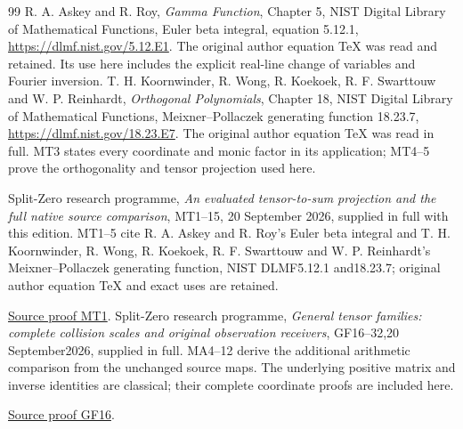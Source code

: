 \documentclass[11pt]{article}
\begin{document}
\begin{thebibliography}{99}
 R. A. Askey and R. Roy, \emph{Gamma Function}, Chapter 5,
NIST Digital Library of Mathematical Functions, Euler beta integral,
equation 5.12.1, \url{https://dlmf.nist.gov/5.12.E1}.
The original author equation TeX was read and retained. Its use here
includes the explicit real-line change of variables and Fourier inversion.
 T. H. Koornwinder, R. Wong, R. Koekoek, R. F. Swarttouw
and W. P. Reinhardt, \emph{Orthogonal Polynomials}, Chapter 18,
NIST Digital Library of Mathematical Functions, Meixner--Pollaczek
generating function 18.23.7, \url{https://dlmf.nist.gov/18.23.E7}.
The original author equation TeX was read in full. MT3 states every
coordinate and monic factor in its application; MT4--5 prove the
orthogonality and tensor projection used here.


 Split-Zero research programme, \emph{An evaluated tensor-to-sum
projection and the full native source comparison}, MT1--15,
20 September 2026, supplied in full with this edition. MT1--5 cite
R. A. Askey and R. Roy's Euler beta integral and T. H. Koornwinder,
R. Wong, R. Koekoek, R. F. Swarttouw and W. P. Reinhardt's
Meixner--Pollaczek generating function, NIST DLMF5.12.1 and18.23.7;
original author equation TeX and exact uses are retained.

\href{https://github.com/KokunoYumeto/zeta-function-research-reader/blob/main/workbenches/splitzero-tandem/continuations/20260921-kernel-degree-steps/providers/OBSERVATION_COMPLETE_PROOFS.tex\#L1629}{Source proof MT1}.
 Split-Zero research programme, \emph{General tensor families:
complete collision scales and original observation receivers},
GF16--32,20 September2026, supplied in full. MA4--12 derive the
additional arithmetic comparison from the unchanged source maps.
The underlying positive matrix and inverse identities are classical;
their complete coordinate proofs are included here.


\href{https://github.com/KokunoYumeto/zeta-function-research-reader/blob/main/workbenches/splitzero-tandem/continuations/20260921-kernel-degree-steps/providers/OBSERVATION_COMPLETE_PROOFS.tex\#L1383}{Source proof GF16}.
\end{thebibliography}
\end{document}

